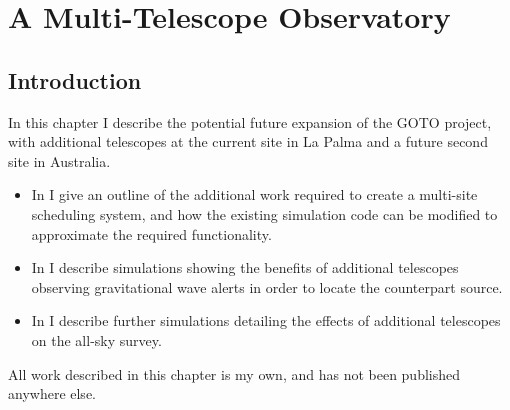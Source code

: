 \chapter{A Multi-Telescope Observatory}
\label{chap:multiscope}
\chaptoc{}


\newpage
\section{Introduction}
\label{sec:multiscope_intro}
\begin{colsection}

In this chapter I describe the potential future expansion of the GOTO project, with additional telescopes at the current site in La Palma and a future second site in Australia.
%
\begin{itemize}
    \item In  I give an outline of the additional work required to create a multi-site scheduling system, and how the existing simulation code can be modified to approximate the required functionality.
    \item In  I describe simulations showing the benefits of additional telescopes observing gravitational wave alerts in order to locate the counterpart source.
    \item In  I describe further simulations detailing the effects of additional telescopes on the all-sky survey.
\end{itemize}
%
All work described in this chapter is my own, and has not been published anywhere else.

\end{colsection}


\newpage
